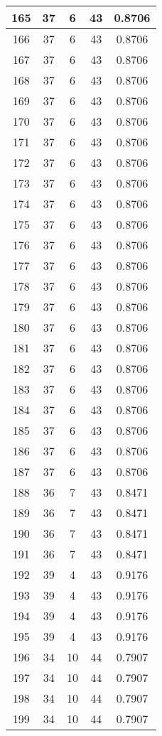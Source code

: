 \documentclass[letterpaper, 12pt]{article}
\begin{document}
\begin{longtable}{|c|c|c|c|c|}
\hline
165 & 37 & 6 & 43 & 0.8706 \\
\hline
166 & 37 & 6 & 43 & 0.8706 \\
\hline
167 & 37 & 6 & 43 & 0.8706 \\
\hline
168 & 37 & 6 & 43 & 0.8706 \\
\hline
169 & 37 & 6 & 43 & 0.8706 \\
\hline
170 & 37 & 6 & 43 & 0.8706 \\
\hline
171 & 37 & 6 & 43 & 0.8706 \\
\hline
172 & 37 & 6 & 43 & 0.8706 \\
\hline
173 & 37 & 6 & 43 & 0.8706 \\
\hline
174 & 37 & 6 & 43 & 0.8706 \\
\hline
175 & 37 & 6 & 43 & 0.8706 \\
\hline
176 & 37 & 6 & 43 & 0.8706 \\
\hline
177 & 37 & 6 & 43 & 0.8706 \\
\hline
178 & 37 & 6 & 43 & 0.8706 \\
\hline
179 & 37 & 6 & 43 & 0.8706 \\
\hline
180 & 37 & 6 & 43 & 0.8706 \\
\hline
181 & 37 & 6 & 43 & 0.8706 \\
\hline
182 & 37 & 6 & 43 & 0.8706 \\
\hline
183 & 37 & 6 & 43 & 0.8706 \\
\hline
184 & 37 & 6 & 43 & 0.8706 \\
\hline
185 & 37 & 6 & 43 & 0.8706 \\
\hline
186 & 37 & 6 & 43 & 0.8706 \\
\hline
187 & 37 & 6 & 43 & 0.8706 \\
\hline
188 & 36 & 7 & 43 & 0.8471 \\
\hline
189 & 36 & 7 & 43 & 0.8471 \\
\hline
190 & 36 & 7 & 43 & 0.8471 \\
\hline
191 & 36 & 7 & 43 & 0.8471 \\
\hline
192 & 39 & 4 & 43 & 0.9176 \\
\hline
193 & 39 & 4 & 43 & 0.9176 \\
\hline
194 & 39 & 4 & 43 & 0.9176 \\
\hline
195 & 39 & 4 & 43 & 0.9176 \\
\hline
196 & 34 & 10 & 44 & 0.7907 \\
\hline
197 & 34 & 10 & 44 & 0.7907 \\
\hline
198 & 34 & 10 & 44 & 0.7907 \\
\hline
199 & 34 & 10 & 44 & 0.7907 \\
\hline
\end{longtable}
\end{document}
